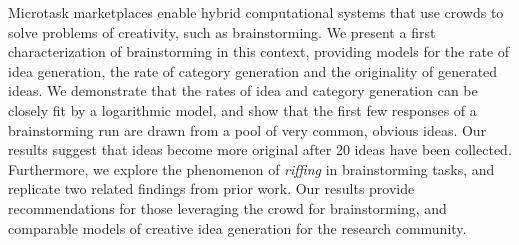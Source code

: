 Microtask marketplaces enable hybrid computational systems that use crowds to solve problems of creativity, such as brainstorming. We present a first characterization of brainstorming in this context, providing models for the rate of idea generation, the rate of category generation and the originality of generated ideas. We demonstrate that the rates of idea and category generation can be closely fit by a logarithmic model, and show that the first few responses of a brainstorming run are drawn from a pool of very common, obvious ideas. Our results suggest that ideas become more original after 20 ideas have been collected. Furthermore, we explore the phenomenon of \emph{riffing} in brainstorming tasks, and replicate two related findings from prior work. Our results provide recommendations for those leveraging the crowd for brainstorming, and comparable models of creative idea generation for the research community.


